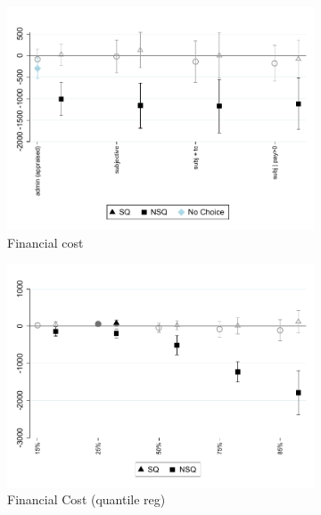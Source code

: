 \documentclass[11pt]{article}
\begin{document}
\begin{figure}[H]
    \caption{The Effect of choice (with fees)}
    \label{fc_pro4}
    \begin{center}
    \begin{subfigure}{0.45\textwidth}
        \caption{Financial cost}
        \centering
        \includegraphics[width=\textwidth]{Figuras/fc_te_pro_4.pdf}
    \end{subfigure}
        \begin{subfigure}{0.45\textwidth}
        \caption{Financial Cost (quantile reg)}
        \centering
        \includegraphics[width=\textwidth]{Figuras/fc_quantile_pro_4.pdf}
    \end{subfigure}
    \begin{subfigure}{0.60\textwidth}

\end{subfigure}
\end{center}
\end{figure}
\end{document}
